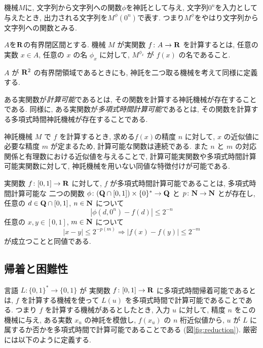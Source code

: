 機械$M$に, 
文字列から文字列への関数$\phi$を神託として与え, 
文字列$0 ^n$を入力として与えたとき, 
出力される文字列を$M ^\phi (0 ^n)$で表す. 
つまり$M ^\phi$をやはり文字列から文字列への関数とみる. 

\begin{definition}
$A$を$\mathbf R$の有界閉区間とする. 
機械 $M$ が実関数 $f \colon A \to \mathbf R$ を計算するとは,
任意の実数 $x \in A$, 任意の $x$ の名 $\phi_x$ に対して,
$M^{\phi_x}$ が $f(x)$ の名であること.
\end{definition}

$A$ が $\mathbf R ^2$ の有界閉領域であるときにも, 
神託を二つ取る機械を考えて同様に定義する. 

 ある実関数が\emph{計算可能}であるとは, その関数を計算する神託機械が存在することである.
 同様に, ある実関数が\emph{多項式時間計算可能}であるとは, その関数を計算する多項式時間神託機械が存在することである.

 神託機械 $M$ で $f$ を計算するとき, 求める$f (x)$の精度 $n$ に対して,
 $x$ の近似値に必要な精度 $m$ が定まるため,
 計算可能な関数は連続である.
 また $n$ と $m$ の対応関係と有理数における近似値を与えることで,
 計算可能実関数や多項式時間計算可能実関数に対して,
 神託機械を用いない同値な特徴付けが可能である.

\begin{lemma}
  \label{lem:type1representation}
  実関数 $f\colon [0,1] \to \mathbf R$ に対して,
  $f$ が多項式時間計算可能であることは, 
  多項式時間計算可能な
  二つの関数 $\phi \colon (\mathbf Q \cap [0, 1]) \times \{0\} ^* \to \mathbf Q$ と
  $p \colon \mathbf N \to \mathbf N$ とが存在し, 
  任意の $d \in \mathbf Q \cap [0,1]$, $n \in \mathbf N$ について
  \begin{equation}
   |\phi(d, 0^n) - f(d)| \le 2^{-n} 
  \end{equation}
  任意の $x, y \in [0, 1]$, $m \in \mathbf N$ について
  \begin{equation}
   |x-y| \le 2^{-p(m)} \Rightarrow |f(x) - f(y)| \le 2^{-m} 
  \end{equation}
  が成立つことと同値である. 
\end{lemma}



\subsection{帰着と困難性}

 言語 $L \colon \{0, 1\} ^* \to \{0, 1\}$ が
 実関数 $f\colon [0,1] \to \mathbf R$ に多項式時間帰着可能であるとは,
 $f$ を計算する機械を使って $L(u)$ を多項式時間で計算可能であることである.
 つまり $f$ を計算する機械があるとしたとき, 入力 $u$ に対して,
 精度 $n$ をこの機械に与え, ある実数 $x_u$ の神託を模倣し, $f(x_u)$ の $n$ 桁近似値から,
 $u$ が $L$ に属するか否かを多項式時間で計算可能であることである
 (図\ref{fig:reduction}).
 厳密には以下のように定義する.

